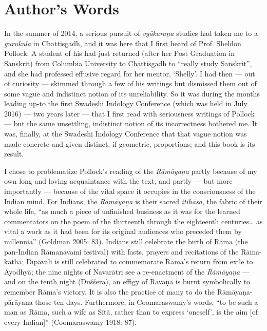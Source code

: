 \makeatletter
\def\@makeschapterhead#1{%
  \vspace*{50\p@}%
  {\parindent \z@ \raggedright
    \normalfont
    \interlinepenalty\@M
    \LARGE \bfseries  #1\par\nobreak
    \vskip 30\p@
  }}
\makeatother

\chapter*{Author's Words}\label{authors-words}


In the summer of 2014, a serious pursuit of {\sl vyākaraṇa} studies had taken me to a {\sl gurukula} in Chattisgadh, and it was here that I first heard of Prof. Sheldon Pollock. A student of his had just returned (after her Post Graduation in Sanskrit) from Columbia University to Chattisgadh to “really study Sanskrit”, and she had professed effusive regard for her mentor, ‘Shelly’. I had then --- out of curiosity --- skimmed through a few of his writings but dismissed them out of some vague and indistinct notion of its unreliability. So it was during the months leading up-to the first Swadeshi Indology Conference (which was held in July 2016) --- two years later --- that I first read with seriousness writings of Pollock --- but the same unsettling, indistinct notion of its incorrectness bothered me. It was, finally, at the Swadeshi Indology Conference that that vague notion was made concrete and given distinct, if geometric, proportions; and this book is its result.  

I chose to problematize Pollock’s reading of the {\sl Rāmāyaṇa} partly because of my own long and loving acquaintance with the text, and partly --- but more importantly --- because of the vital space it occupies in the consciousness of the Indian mind. For Indians, the {\sl Rāmāyaṇa} is their sacred {\sl itihāsa}, the fabric of their whole life, “as much a piece of unfinished business as it was for the learned commentators on the poem of the thirteenth through the eighteenth centuries… as vital a work as it had been for its original audiences who preceded them by millennia” (Goldman 2005: 83). Indians still celebrate the birth of Rāma (the pan-Indian Rāmanavami festival) with fasts, prayers and recitations of the Rāma-kathā; Dīpāvali is still celebrated to commemorate Rāma’s return from exile to Ayodhyā; the nine nights of Navarātri see a re-enactment of the {\sl Rāmāyaṇa} --- and on the tenth night (Duśśera), an effigy of Rāvaṇa is burnt symbolically to remember Rāma’s victory. It is also the practice of many to do the Rāmāyaṇa-pārāyaṇa those ten days. Furthermore, in Coomaraswamy’s words, “to be such a man as Rāma, such a wife as Sītā, rather than to express ‘oneself’, is the aim [of every Indian]” (Coomaraswamy 1918: 87).

